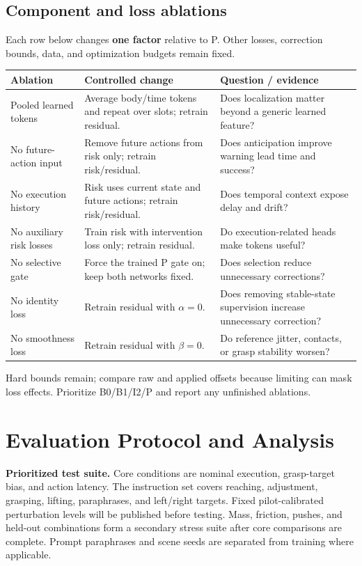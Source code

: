 \documentclass[11pt,a4paper]{article}
\begin{document}
\subsection{Component and loss ablations}
Each row below changes \textbf{one factor} relative to P. Other losses, correction
bounds, data, and optimization budgets remain fixed.

\begingroup
\small
\renewcommand{\arraystretch}{1.1}
\begin{tabularx}{\linewidth}{@{}p{40mm}YY@{}}
\toprule
\textbf{Ablation} & \textbf{Controlled change} & \textbf{Question / evidence} \\
\midrule
Pooled learned tokens & Average body/time tokens and repeat over slots; retrain residual. &
Does localization matter beyond a generic learned feature? \\
No future-action input & Remove future actions from risk only; retrain risk/residual. &
Does anticipation improve warning lead time and success? \\
No execution history & Risk uses current state and future actions; retrain risk/residual. &
Does temporal context expose delay and drift? \\
No auxiliary risk losses & Train risk with intervention loss only; retrain residual. &
Do execution-related heads make tokens useful? \\
No selective gate & Force the trained P gate on; keep both networks fixed. &
Does selection reduce unnecessary corrections? \\
No identity loss & Retrain residual with $\alpha=0$. &
Does removing stable-state supervision increase unnecessary correction? \\
No smoothness loss & Retrain residual with $\beta=0$. &
Do reference jitter, contacts, or grasp stability worsen? \\
\bottomrule
\end{tabularx}
\endgroup

Hard bounds remain; compare raw and applied offsets because limiting can mask
loss effects. Prioritize B0/B1/I2/P and report any unfinished ablations.

\newpage
\section{Evaluation Protocol and Analysis}
\textbf{Prioritized test suite.}
Core conditions are nominal execution, grasp-target bias, and action latency.
The instruction set covers reaching, adjustment, grasping, lifting, paraphrases,
and left/right targets. Fixed pilot-calibrated perturbation levels will be
published before testing. Mass, friction, pushes, and held-out combinations
form a secondary stress suite after core comparisons are complete. Prompt
paraphrases and scene seeds are separated from training where applicable.
\end{document}
